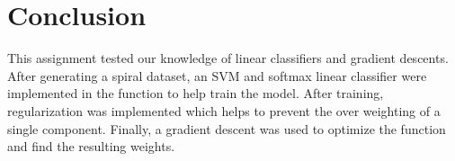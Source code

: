 \documentclass{article}
\begin{document}
\section{Conclusion}
This assignment tested our knowledge of linear classifiers and gradient descents. After generating a spiral dataset, an SVM and softmax linear classifier were implemented in the function to help train the model. After training, regularization was implemented which helps to prevent the over weighting of a single component. Finally, a gradient descent was used to optimize the function and find the resulting weights. 
\end{document}
